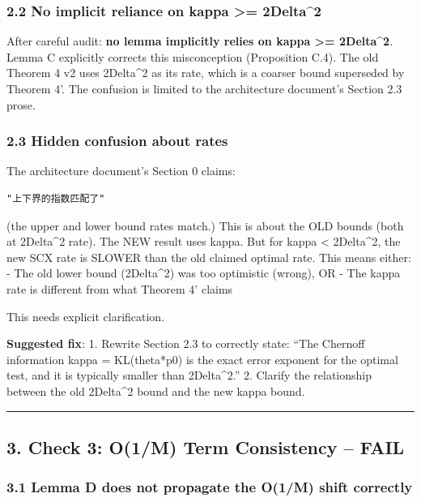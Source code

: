 \documentclass[
  12pt,
]{ctexart}
\begin{document}
\subsubsection{2.2 No implicit reliance on kappa \textgreater=
2Delta\^{}2}\label{no-implicit-reliance-on-kappa-2delta2}

After careful audit: \textbf{no lemma implicitly relies on kappa
\textgreater= 2Delta\^{}2}. Lemma C explicitly corrects this
misconception (Proposition C.4). The old Theorem 4 v2 uses 2Delta\^{}2
as its rate, which is a coarser bound superseded by Theorem 4'. The
confusion is limited to the architecture document's Section 2.3 prose.

\subsubsection{2.3 Hidden confusion about
rates}\label{hidden-confusion-about-rates}

The architecture document's Section 0 claims:

\begin{verbatim}
"上下界的指数匹配了"
\end{verbatim}

(the upper and lower bound rates match.) This is about the OLD bounds
(both at 2Delta\^{}2 rate). The NEW result uses kappa. But for kappa
\textless{} 2Delta\^{}2, the new SCX rate is SLOWER than the old claimed
optimal rate. This means either: - The old lower bound (2Delta\^{}2) was
too optimistic (wrong), OR - The kappa rate is different from what
Theorem 4' claims

This needs explicit clarification.

\textbf{Suggested fix}: 1. Rewrite Section 2.3 to correctly state: ``The
Chernoff information kappa = KL(theta*\textbar\textbar p0) is the exact
error exponent for the optimal test, and it is typically smaller than
2Delta\^{}2.'' 2. Clarify the relationship between the old 2Delta\^{}2
bound and the new kappa bound.

\begin{center}\rule{0.5\linewidth}{0.5pt}\end{center}

\subsection{3. Check 3: O(1/M) Term Consistency --
FAIL}\label{check-3-o1m-term-consistency-fail}

\subsubsection{3.1 Lemma D does not propagate the O(1/M) shift
correctly}\label{lemma-d-does-not-propagate-the-o1m-shift-correctly}
\end{document}
